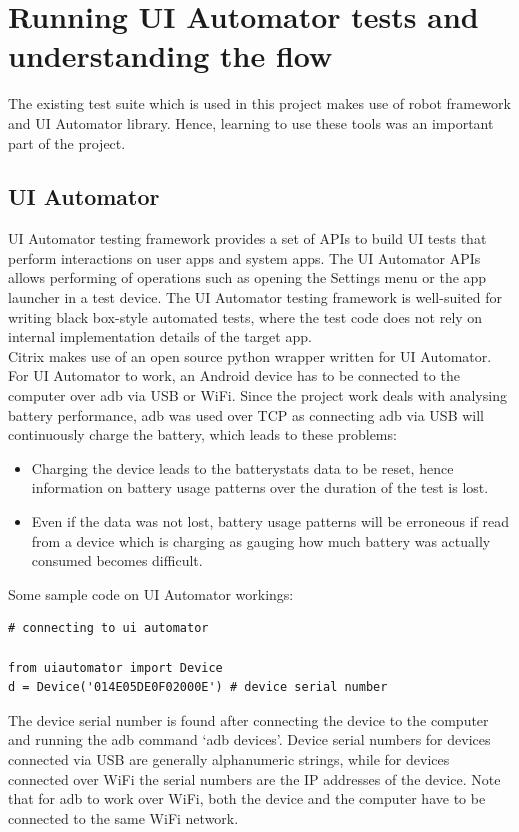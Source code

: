 \section{Running UI Automator tests and understanding the flow} The existing test suite which is used in this project makes use of robot framework and UI Automator library. Hence, learning to use these tools was an important part of the project. \\

\subsection{UI Automator}UI Automator testing framework provides a set of APIs to build UI tests that perform interactions on user apps and system apps. The UI Automator APIs allows performing of operations such as opening the Settings menu or the app launcher in a test device. The UI Automator testing framework is well-suited for writing black box-style automated tests, where the test code does not rely on internal implementation details of the target app.\cite{uiautomatordoc}\cite{uiautomator}\\

Citrix makes use of an open source python wrapper written for UI Automator. For UI Automator to work, an Android device has to be connected to the computer over adb via USB or WiFi. Since the project work deals with analysing battery performance, adb was used over TCP as connecting adb via USB will continuously charge the battery, which leads to these problems:
\begin{itemize}
	\item Charging the device leads to the batterystats data to be reset, hence information on battery usage patterns over the duration of the test is lost.
	\item Even if the data was not lost, battery usage patterns will be erroneous if read from a device which is charging as gauging how much battery was actually consumed becomes difficult.
\end{itemize}	 

Some sample code on UI Automator workings:

\begin{lstlisting}[style=PyStyle]
# connecting to ui automator

from uiautomator import Device
d = Device('014E05DE0F02000E') # device serial number 
\end{lstlisting}

The device serial number is found after connecting the device to the computer and running the adb command `adb devices'. Device serial numbers for devices connected via USB are generally alphanumeric strings, while for devices connected over WiFi the serial numbers are the IP addresses of the device. Note that for adb to work over WiFi, both the device and the computer have to be connected to the same WiFi network.


